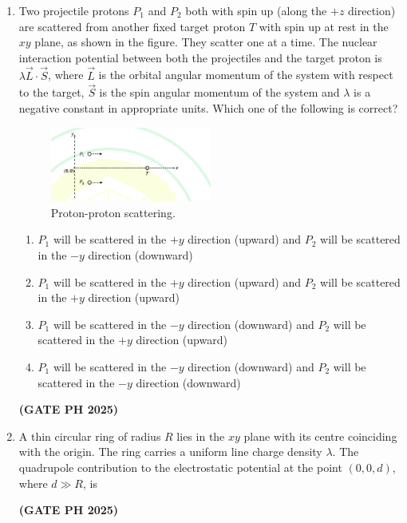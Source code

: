 \documentclass[14pt, a4paper]{extarticle}
\renewcommand{\vec}[1]{\overrightarrow{#1}}
\begin{document}
\begin{enumerate}[label=\textbf{Q.\arabic*}]
\item Two projectile protons $P_1$ and $P_2$ both with spin up (along the $+z$ direction) are scattered from another fixed target proton $T$ with spin up at rest in the $xy$ plane, as shown in the figure. They scatter one at a time. The nuclear interaction potential between both the projectiles and the target proton is $\lambda\vec{L}\cdot\vec{S}$, where $\vec{L}$ is the orbital angular momentum of the system with respect to the target, $\vec{S}$ is the spin angular momentum of the system and $\lambda$ is a negative constant in appropriate units. Which one of the following is correct?
\begin{figure}[H]
\centering
\includegraphics[width=0.5\textwidth]{figs/q39fig25.png}
\caption{Proton-proton scattering.}
\label{fig:q39_proton_scattering}
\end{figure}
\begin{enumerate}
\item $P_1$ will be scattered in the $+y$ direction (upward) and $P_2$ will be scattered in the $-y$ direction (downward)
\item $P_1$ will be scattered in the $+y$ direction (upward) and $P_2$ will be scattered in the $+y$ direction (upward)
\item $P_1$ will be scattered in the $-y$ direction (downward) and $P_2$ will be scattered in the $+y$ direction (upward)
\item $P_1$ will be scattered in the $-y$ direction (downward) and $P_2$ will be scattered in the $-y$ direction (downward)
\end{enumerate}
\hfill \textbf{(GATE PH 2025)}

\item A thin circular ring of radius $R$ lies in the $xy$ plane with its centre coinciding with the origin. The ring carries a uniform line charge density $\lambda$. The quadrupole contribution to the electrostatic potential at the point $(0, 0, d)$, where $d \gg R$, is
\begin{enumerate}
\end{enumerate}
\hfill \textbf{(GATE PH 2025)}


\end{enumerate}
\end{document}
